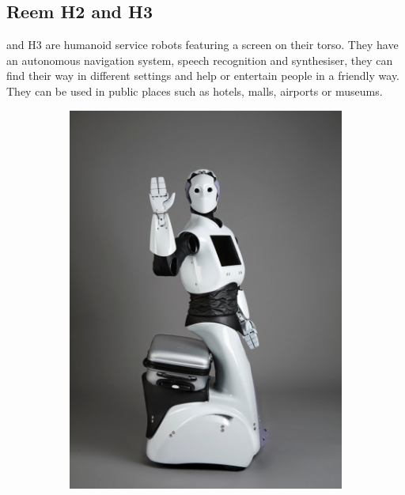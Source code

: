 \subsection{Reem H2 and H3}
  and H3  are humanoid service robots featuring a screen on their torso.
They have an autonomous navigation system, speech recognition and synthesiser, they can find their way in different settings and help or entertain people in a friendly way.
They can be used in public places such as hotels, malls, airports or museums.

\begin{figure}
   \centering
   \begin{subfigure}[b]{0.4\linewidth}
       \includegraphics{figures/reemh2}
       \caption{}
       \label{fig:reemh2}
    \end{subfigure}
    \begin{subfigure}[b]{0.4\linewidth}

\end{subfigure}
\end{figure}
